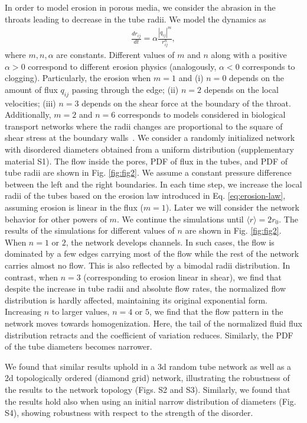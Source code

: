 \documentclass[%
reprint,
 amsmath,amssymb,
 aps,
prl,
]{revtex4-1}
\begin{document}
In order to model erosion in porous media, we consider the abrasion in the throats leading to decrease in the tube radii. We model the dynamics as 
%
\begin{align}
   \frac{dr_{ij}}{dt} = \alpha  \frac{|q_{ij}|^m}{r_{ij}^n}, \label{eq:erosion-law}
\end{align}
%
{where $m,n,\alpha$ are constants. Different values of $m$ and $n$ along with a positive $\alpha>0$ correspond to different erosion physics (analogously, $\alpha<0$ corresponds to clogging). Particularly, the erosion when $m=1$ and  (i) $n=0$ depends on the amount of flux $q_{ij}$ passing through the edge; (ii) $n=2$ depends on the local velocities; (iii) $n=3$ depends on the shear force at the boundary of the throat.} {Additionally, $m=2$ and $n=6$ corresponds to models considered in biological transport networks where the radii changes are {proportional to the square of shear stress at the boundary walls}~\cite{hu2013adaptation,ronellenfitsch2016global}.} 
We consider a randomly initialized network with disordered diameters obtained from a uniform distribution (supplementary material S1). 
The flow inside the pores, PDF of flux in the tubes, and PDF of tube radii are shown in Fig. \ref{fig:fig2}. We assume a constant pressure difference between the left and the right boundaries. In each time step, we increase the local radii of the tubes based on the erosion law introduced in Eq. \eqref{eq:erosion-law}, assuming erosion is linear in the flux ($m=1$). Later we will consider the network behavior for other powers of $m$.
We continue the simulations until $\langle r \rangle = 2 r_0$. 
The results of the simulations for different values of $n$ are shown in Fig. \ref{fig:fig2}. When $n=1$ or $2$,  the network develops channels. In such cases, the flow is dominated by a few edges carrying most of the flow while the rest of the network carries almost no flow. This is also reflected by a bimodal radii distribution. In contrast, when $n=3$  (corresponding to erosion linear in shear), we find that despite the 
increase in tube radii and absolute flow rates, the normalized flow distribution is hardly affected, maintaining its original exponential form. Increasing $n$ to larger values, $n=4$ or $5$, we find that the flow pattern in the network moves towards homogenization. Here, the tail of the normalized fluid flux distribution retracts and the coefficient of variation reduces. Similarly, the PDF of the tube diameters becomes narrower. 

{We found that similar results uphold in a 3d random tube network as well as a 2d topologically ordered (diamond grid) network, illustrating the robustness of the results to the network topology (Figs. S2 and S3). Similarly, we found that the results hold also when using an initial narrow distribution of diameters (Fig. S4), showing robustness with respect to the strength of the disorder.}
\end{document}
